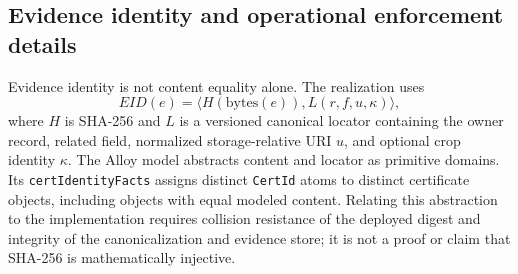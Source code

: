 \documentclass[11pt,a4paper]{article}
\newcommand{\code}[1]{\nolinkurl{#1}}
\begin{document}
\subsection{Evidence identity and operational enforcement details}
Evidence identity is not content equality alone. The realization uses
\begin{equation}
EID(e)=\langle H(\mathrm{bytes}(e)),L(r,f,u,\kappa)\rangle,
\label{eq:evidence}
\end{equation}
where $H$ is SHA-256 and $L$ is a versioned canonical locator containing the owner record, related field, normalized storage-relative URI $u$, and optional crop identity $\kappa$. The Alloy model abstracts content and locator as primitive domains. Its \code{certIdentityFacts} assigns distinct \code{CertId} atoms to distinct certificate objects, including objects with equal modeled content. Relating this abstraction to the implementation requires collision resistance of the deployed digest and integrity of the canonicalization and evidence store; it is not a proof or claim that SHA-256 is mathematically injective.
\end{document}

